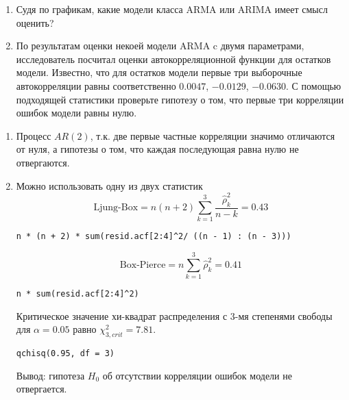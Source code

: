 \begin{problem}
\begin{minipage}{0.6\textwidth}
\begin{center}
\begin{tikzpicture}[scale = 0.025]

\end{tikzpicture}
\end{center}
\end{minipage}

\begin{enumerate}
\item Судя по графикам, какие модели класса ARMA или ARIMA имеет смысл оценить?
\item По результатам оценки некоей модели ARMA c двумя параметрами, исследователь посчитал оценки автокорреляционной функции для остатков модели. Известно, что для остатков модели первые три выборочные автокорреляции равны соответственно $0.0047$, $-0.0129$, $-0.0630$.
С помощью подходящей статистики проверьте гипотезу о том, что первые три корреляции ошибок модели равны нулю.
\end{enumerate}


\begin{sol}
\begin{enumerate}
\item Процесс $AR(2)$, т.к. две первые частные корреляции значимо отличаются от нуля, а гипотезы о том, что каждая последующая равна нулю не отвергаются.
\item Можно использовать одну из двух статистик
\[
\text{Ljung-Box}=n(n+2)\sum_{k=1}^3\frac{\hat{\rho}_k^2}{n-k}=0.43
\]

\begin{verbatim}
n * (n + 2) * sum(resid.acf[2:4]^2/ ((n - 1) : (n - 3)))
\end{verbatim}


\[
\text{Box-Pierce}=n\sum_{k=1}^3\hat{\rho}_k^2=0.41
\]

\begin{verbatim}
n * sum(resid.acf[2:4]^2)
\end{verbatim}

Критическое значение хи-квадрат распределения с 3-мя степенями свободы для $\alpha=0.05$ равно $\chi^2_{3,crit}=7.81$.

\begin{verbatim}
qchisq(0.95, df = 3)
\end{verbatim}

Вывод: гипотеза $H_0$ об отсутствии корреляции ошибок модели не отвергается.
\end{enumerate}
\end{sol}
\end{problem}






